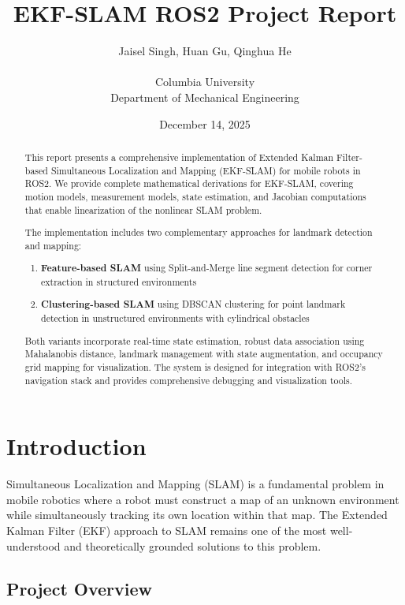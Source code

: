 \documentclass[12pt,a4paper]{article}
\title{
    \vspace{-1cm}
    \textbf{EKF-SLAM ROS2 Project Report} \\[0.5em]
}
\author{
    Jaisel Singh, Huan Gu, Qinghua He \\
    \\
    Columbia University \\
    Department of Mechanical Engineering
}
\date{December 14, 2025}
\begin{document}
\maketitle

\begin{abstract}
This report presents a comprehensive implementation of Extended Kalman Filter-based Simultaneous Localization and Mapping (EKF-SLAM) for mobile robots in ROS2. We provide complete mathematical derivations for EKF-SLAM, covering motion models, measurement models, state estimation, and Jacobian computations that enable linearization of the nonlinear SLAM problem.

The implementation includes two complementary approaches for landmark detection and mapping:
\begin{enumerate}
    \item \textbf{Feature-based SLAM} using Split-and-Merge line segment detection for corner extraction in structured environments
    \item \textbf{Clustering-based SLAM} using DBSCAN clustering for point landmark detection in unstructured environments with cylindrical obstacles
\end{enumerate}

Both variants incorporate real-time state estimation, robust data association using Mahalanobis distance, landmark management with state augmentation, and occupancy grid mapping for visualization. The system is designed for integration with ROS2's navigation stack and provides comprehensive debugging and visualization tools.
\end{abstract}

\tableofcontents
\newpage

\section{Introduction}

Simultaneous Localization and Mapping (SLAM) is a fundamental problem in mobile robotics where a robot must construct a map of an unknown environment while simultaneously tracking its own location within that map. The Extended Kalman Filter (EKF) approach to SLAM remains one of the most well-understood and theoretically grounded solutions to this problem.

\subsection{Project Overview}
\end{document}
